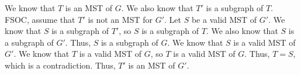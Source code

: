 \documentclass{article} %
\begin{document}

    We know that $T$ is an MST of $G$. We also know that $T'$ is a subgraph of $T$. FSOC, assume that $T'$ is not an MST for $G'$. Let $S$ be a valid MST of $G'$. We know that $S$ is a subgraph of $T'$, so $S$ is a subgraph of $T$. We also know that $S$ is a subgraph of $G'$. Thus, $S$ is a subgraph of $G$. We know that $S$ is a valid MST of $G'$. We know that $T$ is a valid MST of $G$, so $T$ is a valid MST of $G$. Thus, $T = S$, which is a contradiction. Thus, $T'$ is an MST of $G'$.
\end{document}
